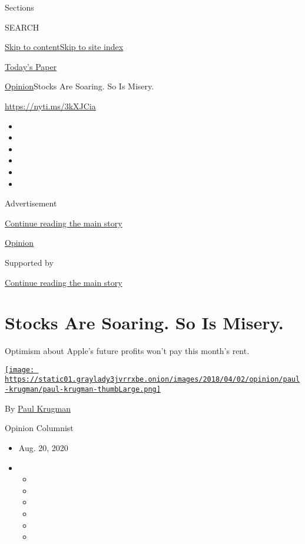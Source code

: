 Sections

SEARCH

\protect\hyperlink{site-content}{Skip to
content}\protect\hyperlink{site-index}{Skip to site index}

\href{https://myaccount.nytimes3xbfgragh.onion/auth/login?response_type=cookie\&client_id=vi}{}

\href{https://www.nytimes3xbfgragh.onion/section/todayspaper}{Today's
Paper}

\href{/section/opinion}{Opinion}\textbar{}Stocks Are Soaring. So Is
Misery.

\url{https://nyti.ms/3kXJCia}

\begin{itemize}
\item
\item
\item
\item
\item
\item
\end{itemize}

Advertisement

\protect\hyperlink{after-top}{Continue reading the main story}

\href{/section/opinion}{Opinion}

Supported by

\protect\hyperlink{after-sponsor}{Continue reading the main story}

\hypertarget{stocks-are-soaring-so-is-misery}{%
\section{Stocks Are Soaring. So Is
Misery.}\label{stocks-are-soaring-so-is-misery}}

Optimism about Apple's future profits won't pay this month's rent.

\href{https://www.nytimes3xbfgragh.onion/by/paul-krugman}{\texttt{[image: https://static01.graylady3jvrrxbe.onion/images/2018/04/02/opinion/paul-krugman/paul-krugman-thumbLarge.png]}}

By \href{https://www.nytimes3xbfgragh.onion/by/paul-krugman}{Paul
Krugman}

Opinion Columnist

\begin{itemize}
\item
  Aug. 20, 2020
\item
  \begin{itemize}
  \item
  \item
  \item
  \item
  \item
  \item
  \end{itemize}
\end{itemize}

